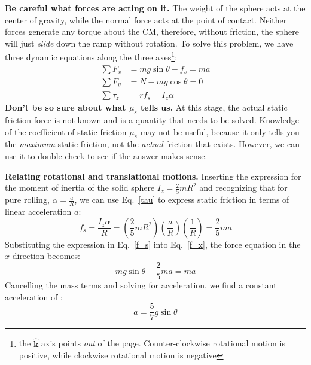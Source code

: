 \documentclass[11pt]{article}
\newcommand{\kkk}{\bm{\hat{k}}}
\begin{document}
\textbf{Be careful what forces are acting on it.} The weight of the sphere acts
at the center of gravity, while the normal force acts at the point of contact.
Neither forces generate any torque about the CM, therefore, without friction,
the sphere will just \emph{slide} down the ramp without rotation. To solve this
problem, we have three dynamic equations along the three
axes\footnote{the $\kkk$ axis points \emph{out} of the page. Counter-clockwise
  rotational motion is positive, while clockwise rotational motion is negative}:
\begin{align}
  \sum F_x&=mg\sin\theta-f_s=ma\\ \label{f_x}
  \sum F_y&=N-mg\cos\theta=0\\
  \sum\tau_z&=rf_s=I_z\alpha \label{tau}
\end{align}
\textbf{Don't be so sure about what $\mu_s$ tells us.} At this stage, the
actual static friction force is not known and is a quantity that needs to be
solved. Knowledge of the coefficient of static friction $\mu_s$ may not be
useful, because it only tells you the \emph{maximum} static friction, not the
\emph{actual} friction that exists. However, we can use it to double check to
see if the answer makes sense.

\textbf{Relating rotational and translational motions.} Inserting the
expression for the moment of inertia of the solid sphere
$\displaystyle I_z=\frac25 mR^2$
and recognizing that for pure rolling,
$\displaystyle\alpha=\frac{a}{R}$, we can use Eq.~\ref{tau} to express static
friction in terms of linear acceleration $a$:
\begin{equation}
  f_s=\frac{I_z\alpha}{R}=
  \left(\frac25 mR^2\right)
  \left(\frac{a}{R}\right)
  \left(\frac{1}{R}\right)=\frac25ma
  \label{f_s}
\end{equation}
Substituting the expression in Eq.~\ref{f_s} into Eq.~\ref{f_x}, the force
equation in the $x$-direction becomes:
\begin{equation}
  mg\sin\theta-\frac25 ma=ma
\end{equation}
Cancelling the mass terms and solving for acceleration, we find a constant
acceleration of :
\begin{equation}
  a=\frac57 g\sin\theta
  \label{pure-roll-accel}
\end{equation}
\end{document}
